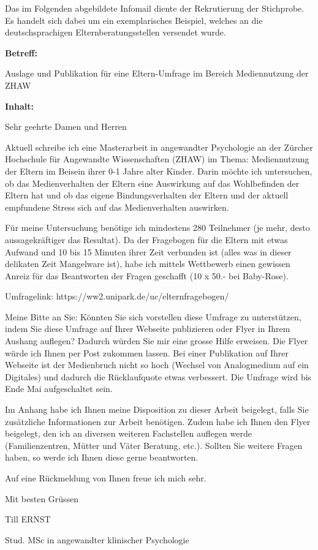 Das im Folgenden abgebildete Infomail diente der Rekrutierung der Stichprobe. Es handelt sich dabei um ein exemplarisches Beispiel, welches an die deutschsprachigen Elternberatungsstellen versendet wurde.

\begin{flushleft}

\textbf{Betreff:}

Auslage und Publikation für eine Eltern-Umfrage im Bereich Mediennutzung der ZHAW
\vspace{2mm}

\textbf{Inhalt:}

Sehr geehrte Damen und Herren

\vspace{2mm}
Aktuell schreibe ich eine Masterarbeit in angewandter Psychologie an der Zürcher Hochschule für Angewandte Wissenschaften (ZHAW) im Thema: Mediennutzung der Eltern im Beisein ihrer 0-1 Jahre alter Kinder.
Darin möchte ich untersuchen, ob das Medienverhalten der Eltern eine Auswirkung auf das Wohlbefinden der Eltern hat und ob das eigene Bindungsverhalten der Eltern und der aktuell empfundene Stress sich auf das Medienverhalten auswirken. 

\vspace{2mm}
Für meine Untersuchung benötige ich mindestens 280 Teilnehmer (je mehr, desto aussagekräftiger das Resultat). Da der Fragebogen für die Eltern mit etwas Aufwand und 10 bis 15 Minuten ihrer Zeit verbunden ist (alles was in dieser delikaten Zeit Mangelware ist), habe ich mittels Wettbewerb einen gewissen Anreiz für das Beantworten der Fragen geschafft (10 x 50.- bei Baby-Rose).

\vspace{2mm}
Umfragelink: https://ww2.unipark.de/uc/elternfragebogen/

\vspace{2mm}
Meine Bitte an Sie: Könnten Sie sich vorstellen diese Umfrage zu unterstützen, indem Sie diese Umfrage auf Ihrer Webseite publizieren oder Flyer in Ihrem Aushang auflegen? Dadurch würden Sie mir eine grosse Hilfe erweisen. Die Flyer würde ich Ihnen per Post zukommen lassen. Bei einer Publikation auf Ihrer Webseite ist der Medienbruch nicht so hoch (Wechsel von Analogmedium auf ein Digitales) und dadurch die Rücklaufquote etwas verbessert.
Die Umfrage wird bis Ende Mai aufgeschaltet sein.

\vspace{2mm}
Im Anhang habe ich Ihnen meine Disposition zu dieser Arbeit beigelegt, falls Sie zusätzliche Informationen zur Arbeit benötigen. Zudem habe ich Ihnen den Flyer beigelegt, den ich an diversen weiteren Fachstellen auflegen werde (Familienzentren, Mütter und Väter Beratung, etc.). 
Sollten Sie weitere Fragen haben, so werde ich Ihnen diese gerne beantworten.

\vspace{2mm}
Auf eine Rückmeldung von Ihnen freue ich mich sehr.

\vspace{2mm}
Mit besten Grüssen 

Till ERNST

Stud. MSc in angewandter klinischer Psychologie

\end{flushleft}